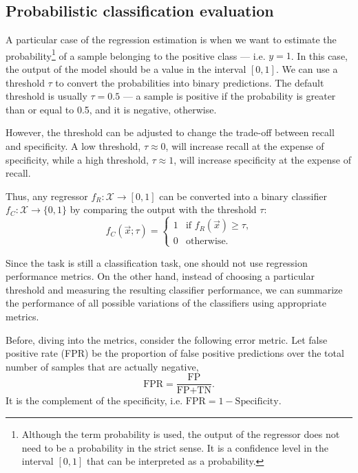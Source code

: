 \subsection{Probabilistic classification evaluation}

A particular case of the regression estimation is when we want to estimate the
probability\footnote{Although the term probability is used, the output of the regressor
does not need to be a probability in the strict sense.  It is a confidence level in the
interval $[0, 1]$ that can be interpreted as a probability.} of a sample belonging to the
positive class --- i.e. $y = 1$.  In this case, the output of the model should be a
value in the interval $[0, 1]$.  We can use a threshold $\tau$ to convert the
probabilities into binary predictions.  The default threshold is usually $\tau = 0.5$ ---
a sample is positive if the probability is greater than or equal to 0.5, and it is negative,
otherwise.

However, the threshold can be adjusted to change the trade-off between recall and
specificity. A low threshold, $\tau \approx 0$, will increase recall at the expense of
specificity, while a high threshold, $\tau \approx 1$, will increase specificity at the
expense of recall.

Thus, any regressor $f_R : \mathcal{X} \rightarrow [0, 1]$ can be converted into a binary
classifier $f_C : \mathcal{X} \rightarrow \{0, 1\}$ by comparing the output with the
threshold $\tau$:
\begin{equation*}
  f_C(\vec{x}; \tau) = \begin{cases}
    1 & \text{if } f_R(\vec{x}) \geq \tau\text{,} \\
    0 & \text{otherwise}\text{.}
  \end{cases}
\end{equation*}

Since the task is still a classification task, one should not use regression performance
metrics.  On the other hand, instead of choosing a particular threshold and measuring the
resulting classifier performance, we can summarize the performance of all possible
variations of the classifiers using appropriate metrics.

Before, diving into the metrics, consider the following error metric.  Let false positive
rate (FPR) be the proportion of false positive predictions over the total number of
samples that are actually negative,
\begin{equation*}
  \text{FPR} = \frac{\text{FP}}{\text{FP} + \text{TN}}\text{.}
\end{equation*}
It is the complement of the specificity, i.e. $\text{FPR} = 1 - \text{Specificity}$.

